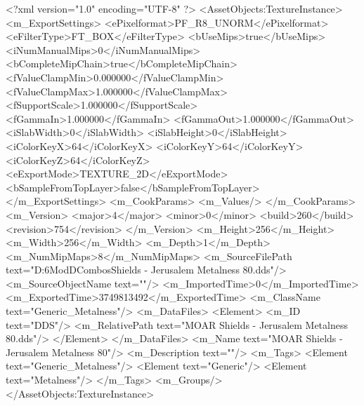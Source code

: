 <?xml version="1.0" encoding="UTF-8" ?>
<AssetObjects:TextureInstance>
	<m_ExportSettings>
		<ePixelformat>PF_R8_UNORM</ePixelformat>
		<eFilterType>FT_BOX</eFilterType>
		<bUseMips>true</bUseMips>
		<iNumManualMips>0</iNumManualMips>
		<bCompleteMipChain>true</bCompleteMipChain>
		<fValueClampMin>0.000000</fValueClampMin>
		<fValueClampMax>1.000000</fValueClampMax>
		<fSupportScale>1.000000</fSupportScale>
		<fGammaIn>1.000000</fGammaIn>
		<fGammaOut>1.000000</fGammaOut>
		<iSlabWidth>0</iSlabWidth>
		<iSlabHeight>0</iSlabHeight>
		<iColorKeyX>64</iColorKeyX>
		<iColorKeyY>64</iColorKeyY>
		<iColorKeyZ>64</iColorKeyZ>
		<eExportMode>TEXTURE_2D</eExportMode>
		<bSampleFromTopLayer>false</bSampleFromTopLayer>
	</m_ExportSettings>
	<m_CookParams>
		<m_Values/>
	</m_CookParams>
	<m_Version>
		<major>4</major>
		<minor>0</minor>
		<build>260</build>
		<revision>754</revision>
	</m_Version>
	<m_Height>256</m_Height>
	<m_Width>256</m_Width>
	<m_Depth>1</m_Depth>
	<m_NumMipMaps>8</m_NumMipMaps>
	<m_SourceFilePath text="D:\Civ6Mod\3D\Crusader\Jerusalem\Selected Combos\MOAR Shields - Jerusalem Metalness 80.dds"/>
	<m_SourceObjectName text=""/>
	<m_ImportedTime>0</m_ImportedTime>
	<m_ExportedTime>3749813492</m_ExportedTime>
	<m_ClassName text="Generic_Metalness"/>
	<m_DataFiles>
		<Element>
			<m_ID text="DDS"/>
			<m_RelativePath text="MOAR Shields - Jerusalem Metalness 80.dds"/>
		</Element>
	</m_DataFiles>
	<m_Name text="MOAR Shields - Jerusalem Metalness 80"/>
	<m_Description text=""/>
	<m_Tags>
		<Element text="Generic_Metalness"/>
		<Element text="Generic"/>
		<Element text="Metalness"/>
	</m_Tags>
	<m_Groups/>
</AssetObjects:TextureInstance>

 